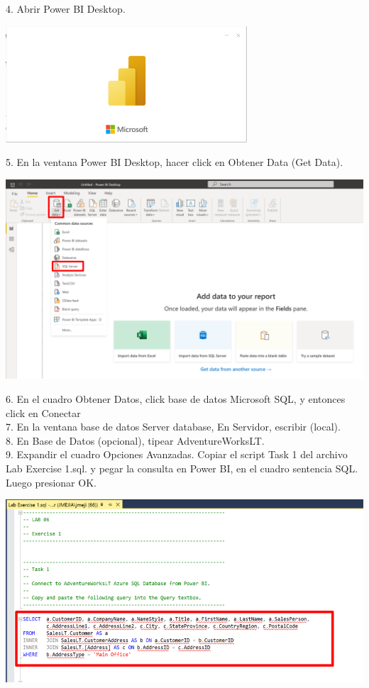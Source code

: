 \documentclass[12pt,letterpaper]{article}
\begin{document}
4. Abrir Power BI Desktop.
\begin{center}
    \includegraphics[width=9cm]{img/7.png}  
\end{center}
5. En la ventana Power BI Desktop, hacer click en Obtener Data (Get Data).
\begin{center}
    \includegraphics[width=15cm]{img/8.png}  
\end{center}
6. En el cuadro Obtener Datos, click base de datos Microsoft SQL, y entonces click en Conectar
\\7. En la ventana base de datos Server database, En Servidor, escribir (local).
\\8. En Base de Datos (opcional), tipear AdventureWorksLT.
\\9. Expandir el cuadro Opciones Avanzadas. Copiar el script Task 1 del archivo Lab Exercise 1.sql. y pegar
la consulta en Power BI, en el cuadro sentencia SQL. Luego presionar OK.
\begin{center}
    \includegraphics[width=15cm]{img/9.png}  
\end{center}
\end{document}
